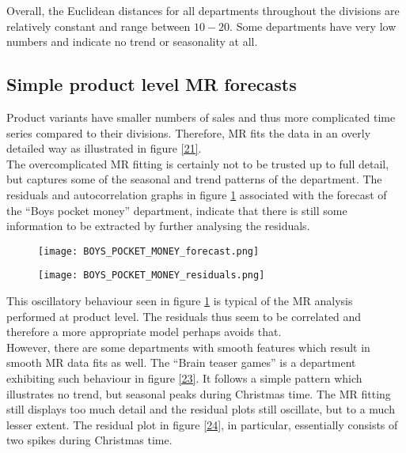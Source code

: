 \documentclass[11pt]{article}
\begin{document}
Overall, the Euclidean distances for all departments throughout the divisions are relatively constant and range between $10-20$. Some departments have very low numbers and indicate no trend or seasonality at all.

\subsection{Simple product level MR forecasts}
Product variants have smaller numbers of sales and thus more complicated time series compared to their divisions. Therefore, MR fits the data in an overly detailed way as illustrated in figure \ref{21}.\\

The overcomplicated MR fitting is certainly not to be trusted up to full detail, but captures some of the seasonal and trend patterns of the department. The residuals and autocorrelation graphs in figure \ref{22} associated with the forecast of the ``Boys pocket money'' department, indicate that there is still some information to be extracted by further analysing the residuals.

\clearpage

\begin{figure}[ht]
\centering
\begin{minipage}{.7\textwidth}
  \centering
  \texttt{[image: BOYS\_POCKET\_MONEY\_forecast.png]}
  \label{21}
\end{minipage}
\begin{minipage}{.7\textwidth}
  \centering
  \texttt{[image: BOYS\_POCKET\_MONEY\_residuals.png]}
  \label{22}
\end{minipage}
\end{figure}

\clearpage

This oscillatory behaviour seen in figure \ref{22} is typical of the MR analysis performed at product level. The residuals thus seem to be correlated and therefore a more appropriate model perhaps avoids that.\\

However, there are some departments with smooth features which result in smooth MR data fits as well. The ``Brain teaser games'' is a department exhibiting such behaviour in figure \ref{23}. It follows a simple pattern which illustrates no trend, but seasonal peaks during Christmas time. The MR fitting still displays too much detail and the residual plots still oscillate, but to a much lesser extent. The residual plot in figure \ref{24}, in particular, essentially consists of two spikes during Christmas time.
\end{document}
